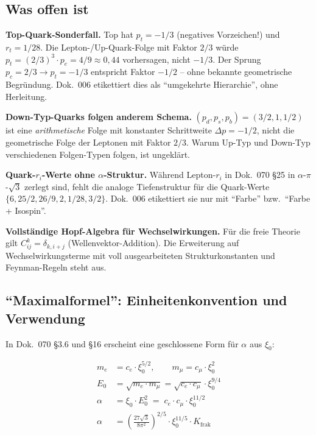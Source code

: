 \subsection{Was offen ist}

\textbf{Top-Quark-Sonderfall.}
Top hat $p_t = -1/3$ (negatives Vorzeichen!) und $r_t = 1/28$.
Die Lepton-/Up-Quark-Folge mit Faktor $2/3$ würde $p_t = (2/3)^3 \cdot
p_e = 4/9 \approx 0{,}44$ vorhersagen, nicht $-1/3$. Der Sprung
$p_c = 2/3 \to p_t = -1/3$ entspricht Faktor $-1/2$ -- ohne bekannte
geometrische Begründung. Dok.~006 etikettiert dies als
\enquote{umgekehrte Hierarchie}, ohne Herleitung.

\textbf{Down-Typ-Quarks folgen anderem Schema.}
$(p_d, p_s, p_b) = (3/2, 1, 1/2)$ ist eine \emph{arithmetische} Folge
mit konstanter Schrittweite $\Delta p = -1/2$, nicht die geometrische
Folge der Leptonen mit Faktor $2/3$. Warum Up-Typ und Down-Typ
verschiedenen Folgen-Typen folgen, ist ungeklärt.

\textbf{Quark-$r_i$-Werte ohne $\alpha$-Struktur.}
Während Lepton-$r_i$ in Dok.~070 §25 in $\alpha$-$\pi$-$\sqrt{3}$
zerlegt sind, fehlt die analoge Tiefenstruktur für die
Quark-Werte $\{6, 25/2, 26/9, 2, 1/28, 3/2\}$. Dok.~006 etikettiert
sie nur mit \enquote{Farbe} bzw.\ \enquote{Farbe + Isospin}.

\textbf{Vollständige Hopf-Algebra für Wechselwirkungen.}
Für die freie Theorie gilt $C^k_{ij} = \delta_{k,i+j}$
(Wellenvektor-Addition). Die Erweiterung auf Wechselwirkungsterme
mit voll ausgearbeiteten Strukturkonstanten und Feynman-Regeln steht
aus.

\subsection{\enquote{Maximalformel}: Einheitenkonvention und Verwendung}
\label{subsec:warnung-maximalformel}

In Dok.~070 §3.6 und §16 erscheint eine geschlossene Form für $\alpha$
aus $\xi_0$:

\begin{align}
  m_e &= c_e \cdot \xi_0^{5/2}, \qquad m_\mu = c_\mu \cdot \xi_0^{2}
  \tag*{(070-4.2)}\\
  E_0 &= \sqrt{m_e \cdot m_\mu} = \sqrt{c_e \cdot c_\mu}\cdot \xi_0^{9/4}
  \tag*{(070-3)}\\
  \alpha &= \xi_0 \cdot E_0^2 \;=\; c_e \cdot c_\mu \cdot \xi_0^{11/2}
  \tag*{(070-3.6.0)}\\
  \alpha &= \left(\frac{27\sqrt{3}}{8\pi^2}\right)^{2/5}
           \cdot \xi_0^{11/5} \cdot K_{\text{frak}}
  \tag*{(070-3.6.1)}
\end{align}

